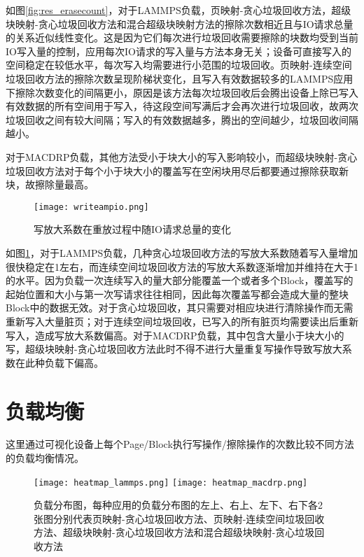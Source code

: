 如图\ref{fig:res_erasecount}，对于LAMMPS负载，页映射-贪心垃圾回收方法，超级块映射-贪心垃圾回收方法和混合超级块映射方法的擦除次数相近且与IO请求总量的关系近似线性变化。这是因为它们每次进行垃圾回收需要擦除的块数均受到当前IO写入量的控制，应用每次IO请求的写入量与方法本身无关；设备可直接写入的空间稳定在较低水平，每次写入均需要进行小范围的垃圾回收。页映射-连续空间垃圾回收方法的擦除次数呈现阶梯状变化，且写入有效数据较多的LAMMPS应用下擦除次数变化的间隔更小，原因是该方法每次垃圾回收后会腾出设备上除已写入有效数据的所有空间用于写入，待这段空间写满后才会再次进行垃圾回收，故两次垃圾回收之间有较大间隔；写入的有效数据越多，腾出的空间越少，垃圾回收间隔越小。

对于MACDRP负载，其他方法受小于块大小的写入影响较小，而超级块映射-贪心垃圾回收方法对于每个小于块大小的覆盖写在空闲块用尽后都要通过擦除获取新块，故擦除量最高。

\begin{figure}[H]
    \centering
    \texttt{[image: writeampio.png]}
    \caption{写放大系数在重放过程中随IO请求总量的变化}
    \label{fig:res_writeamp}
\end{figure}

如图\ref{fig:res_writeamp}，对于LAMMPS负载，几种贪心垃圾回收方法的写放大系数随着写入量增加很快稳定在1左右，而连续空间垃圾回收方法的写放大系数逐渐增加并维持在大于1的水平。因为负载一次连续写入的量大部分能覆盖一个或者多个Block，覆盖写的起始位置和大小与第一次写请求往往相同，因此每次覆盖写都会造成大量的整块Block中的数据无效。对于贪心垃圾回收，其只需要对相应块进行清除操作而无需重新写入大量脏页；对于连续空间垃圾回收，已写入的所有脏页均需要读出后重新写入，造成写放大系数偏高。对于MACDRP负载，其中包含大量小于块大小的写，超级块映射-贪心垃圾回收方法此时不得不进行大量重复写操作导致写放大系数在此种负载下偏高。

\section{负载均衡}

这里通过可视化设备上每个Page/Block执行写操作/擦除操作的次数比较不同方法的负载均衡情况。

\begin{figure}[H]
    \centering
      {\texttt{[image: heatmap\_lammps.png]}}
    \vspace{4em}
        {\texttt{[image: heatmap\_macdrp.png]}}
    \caption[负载分布图]{负载分布图，每种应用的负载分布图的左上、右上、左下、右下各2张图分别代表页映射-贪心垃圾回收方法、页映射-连续空间垃圾回收方法、超级块映射-贪心垃圾回收方法和混合超级块映射-贪心垃圾回收方法}
    \label{fig:res_heatmap}
\end{figure}

